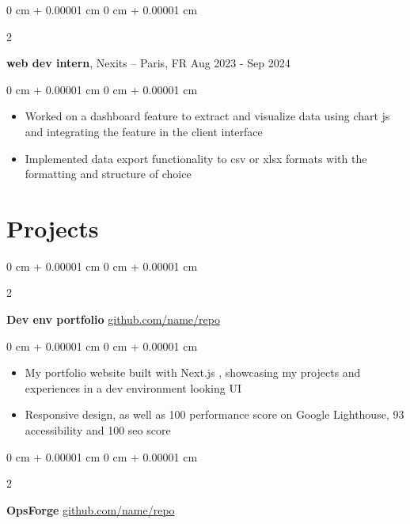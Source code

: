 \documentclass[10pt, letterpaper]{article}
\newenvironment{highlights}{
    \begin{itemize}[
        topsep=0.10 cm,
        parsep=0.10 cm,
        partopsep=0pt,
        itemsep=0pt,
        leftmargin=0 cm + 10pt
    ]
}{
    \end{itemize}
} %
\newenvironment{onecolentry}{
    \begin{adjustwidth}{
        0 cm + 0.00001 cm
    }{
        0 cm + 0.00001 cm
    }
}{
    \end{adjustwidth}
} %
\newenvironment{twocolentry}[2][]{
    \onecolentry
    \def\secondColumn{#2}
    \setcolumnwidth{\fill, 4.5 cm}
    \begin{paracol}{2}
}{
    \switchcolumn \raggedleft \secondColumn
    \end{paracol}
    \endonecolentry
} %
\begin{document}
                        \begin{twocolentry}{
            Aug 2023 - Sep 2024
        }
            \textbf{web dev intern}, Nexits  -- Paris, FR\end{twocolentry}

        \vspace{0.10 cm}
        \begin{onecolentry}
            \begin{highlights}

                \item Worked on a dashboard feature to extract and visualize data using chart js and integrating the feature in the client interface
                \item Implemented data export functionality to csv or xlsx formats with the formatting and structure of choice

                \end{highlights}

        \end{onecolentry}

    
    \section{Projects}


                \begin{twocolentry}{
            \href{https://github.com/sinaatalay/rendercv}{github.com/name/repo}
        }
            \textbf{Dev env portfolio}\end{twocolentry}

        \vspace{0.10 cm}
        \begin{onecolentry}
            \begin{highlights}
            \item My portfolio website built with Next.js , showcasing my projects and experiences in a dev environment looking UI  
            \item Responsive design, as well as 100 performance score on Google Lighthouse, 93 accessibility and 100 seo score
               \end{highlights}
        \end{onecolentry}

        
        \begin{twocolentry}{
            \href{https://github.com/sinaatalay/rendercv}{github.com/name/repo}
        }
            \textbf{OpsForge}\end{twocolentry}
\end{document}
